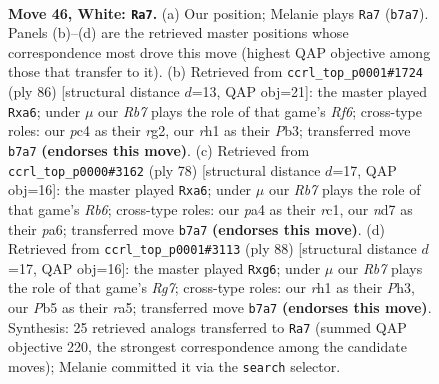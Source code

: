 \documentclass[11pt]{article}
\begin{document}
\clearpage

\begin{figure}[p]\centering
\begin{subfigure}{0.46\textwidth}\centering
\resizebox{\linewidth}{!}{%
\newchessgame
\chessboard[
  setfen={3k4/1R1n4/8/1P1P4/p1p3P1/8/1PK5/7r w - - 3 46},
  showmover=false,
  pgfstyle=straightmove, color=movearrow, markmove={b7-a7}
]}
\caption{}
\end{subfigure}\hfill
\begin{subfigure}{0.46\textwidth}\centering
\resizebox{\linewidth}{!}{%
\newchessgame
\chessboard[
  setfen={8/8/p4R1n/7k/Pp2PK2/1P6/6r1/8 w - - 0 44},
  showmover=false,
  pgfstyle=straightmove, color=movearrow, markmove={f6-a6}
]}
\caption{}
\end{subfigure}
\\[4pt]
\begin{subfigure}{0.46\textwidth}\centering
\resizebox{\linewidth}{!}{%
\newchessgame
\chessboard[
  setfen={8/7p/pR6/5pk1/8/1P2PK1P/8/2r5 w - - 2 40},
  showmover=false,
  pgfstyle=straightmove, color=movearrow, markmove={b6-a6}
]}
\caption{}
\end{subfigure}\hfill
\begin{subfigure}{0.46\textwidth}\centering
\resizebox{\linewidth}{!}{%
\newchessgame
\chessboard[
  setfen={4k3/6R1/6p1/r7/4pp2/7P/4KPP1/8 w - - 0 45},
  showmover=false,
  pgfstyle=straightmove, color=movearrow, markmove={g7-g6}
]}
\caption{}
\end{subfigure}
\caption{\textbf{Move 46, White: \texttt{Ra7}.} (a) Our position; Melanie plays \texttt{Ra7} (\texttt{b7a7}). Panels (b)--(d) are the retrieved master positions whose correspondence most drove this move (highest QAP objective among those that transfer to it). (b) Retrieved from \texttt{ccrl\_top\_p0001\#1724} (ply 86) [structural distance $d$=13, QAP obj=21]: the master played \texttt{Rxa6}; under $\mu$ our \emph{Rb7} plays the role of that game's \emph{Rf6}; cross-type roles: our \emph{p}c4 as their \emph{r}g2, our \emph{r}h1 as their \emph{P}b3; transferred move \texttt{b7a7} \textbf{(endorses this move)}. (c) Retrieved from \texttt{ccrl\_top\_p0000\#3162} (ply 78) [structural distance $d$=17, QAP obj=16]: the master played \texttt{Rxa6}; under $\mu$ our \emph{Rb7} plays the role of that game's \emph{Rb6}; cross-type roles: our \emph{p}a4 as their \emph{r}c1, our \emph{n}d7 as their \emph{p}a6; transferred move \texttt{b7a7} \textbf{(endorses this move)}. (d) Retrieved from \texttt{ccrl\_top\_p0001\#3113} (ply 88) [structural distance $d$=17, QAP obj=16]: the master played \texttt{Rxg6}; under $\mu$ our \emph{Rb7} plays the role of that game's \emph{Rg7}; cross-type roles: our \emph{r}h1 as their \emph{P}h3, our \emph{P}b5 as their \emph{r}a5; transferred move \texttt{b7a7} \textbf{(endorses this move)}. Synthesis: 25 retrieved analogs transferred to \texttt{Ra7} (summed QAP objective 220, the strongest correspondence among the candidate moves); Melanie committed it via the \texttt{search} selector.}
\label{fig:thought-m90}
\end{figure}
\end{document}

